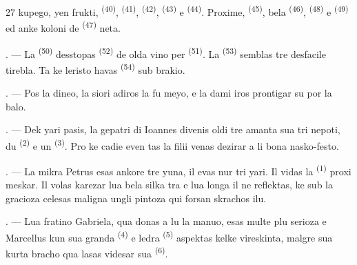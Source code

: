 \begin{VUpage}[29]{27}
\VUcontinue
kupego, yen frukti,  \textsuperscript{(40)},  \textsuperscript{(41)},\nl
{} \textsuperscript{(42)},  \textsuperscript{(43)} e  \textsuperscript{(44)}. Proxime,\nl
{} \textsuperscript{(45)}, bela  \textsuperscript{(46)},  \textsuperscript{(48)} e\nl
{} \textsuperscript{(49)} ed anke koloni de  \textsuperscript{(47)} neta.

. --- La  \textsuperscript{(50)} desstopas  \textsuperscript{(52)}\nl
de olda vino per  \textsuperscript{(51)}. La \nl
{} \textsuperscript{(53)} semblas tre desfacile tirebla. Ta ke\cc
leristo havas  \textsuperscript{(54)} sub brakio.

. --- Pos la dineo, la siori adiros la fu\cc
meyo, e la dami iros prontigar su por la balo.

\VUsaut{5.0mm}
\VUsaut{1.6mm}
\VUsaut{2.6mm}

\VUsaut{3.0mm}

. --- Dek yari pasis, la gepatri di Ioannes\nl
divenis oldi tre amanta sua tri nepoti, du \cc
{} \textsuperscript{(2)} e un  \textsuperscript{(3)}. Pro ke cadie even\cc
tas  la filii venas dezirar\nl
a li bona nasko-festo.

. --- La mikra Petrus esas ankore tre yuna,\nl
il evas nur tri yari. Il vidas la  \textsuperscript{(1)} proxi\cc
meskar. Il volas karezar lua bela  silka\cc
tra e lua longa  il ne reflektas, ke sub\nl
la gracioza  celesas maligna ungli pintoza\nl
qui forsan skrachos ilu.

. --- Lua fratino Gabriela, qua donas a lu la\nl
manuo, esas multe plu serioza e Marcellus kun\nl
sua granda  \textsuperscript{(4)} e ledra  \textsuperscript{(5)} aspektas\nl
kelke vireskinta, malgre sua kurta bracho qua\nl
lasas videsar sua  \textsuperscript{(6)}.
\end{VUpage}

